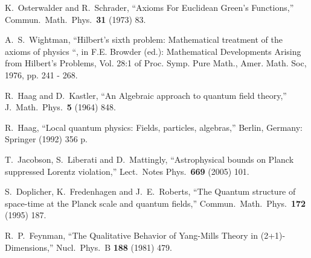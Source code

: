 \documentclass[12pt]{article}
\begin{document}
\begin{thebibliography}{99}
  K.~Osterwalder and R.~Schrader,
  ``Axioms For Euclidean Green's Functions,''
  Commun.\ Math.\ Phys.\  {\bf 31} (1973) 83.


A.~S.~Wightman,  ``Hilbert's sixth problem: Mathematical treatment of the axioms of physics ``, in F.E. Browder (ed.): Mathematical Developments Arising from Hilbert's Problems, Vol. 28:1 of Proc. Symp. Pure Math., Amer. Math. Soc, 1976, pp. 241 - 268.



  R.~Haag and D.~Kastler,
  ``An Algebraic approach to quantum field theory,''
  J.\ Math.\ Phys.\  {\bf 5} (1964) 848.


  R.~Haag,
  ``Local quantum physics: Fields, particles, algebras,''
  Berlin, Germany: Springer (1992) 356 p. 





  T.~Jacobson, S.~Liberati and D.~Mattingly,
  ``Astrophysical bounds on Planck suppressed Lorentz violation,''
  Lect.\ Notes Phys.\  {\bf 669} (2005) 101.






  S.~Doplicher, K.~Fredenhagen and J.~E.~Roberts,
  ``The Quantum structure of space-time at the Planck scale and quantum fields,''
  Commun.\ Math.\ Phys.\  {\bf 172} (1995) 187.






  R.~P.~Feynman,
  ``The Qualitative Behavior of Yang-Mills Theory in (2+1)-Dimensions,''
  Nucl.\ Phys.\ B {\bf 188} (1981) 479.


\end{thebibliography}
\end{document}
